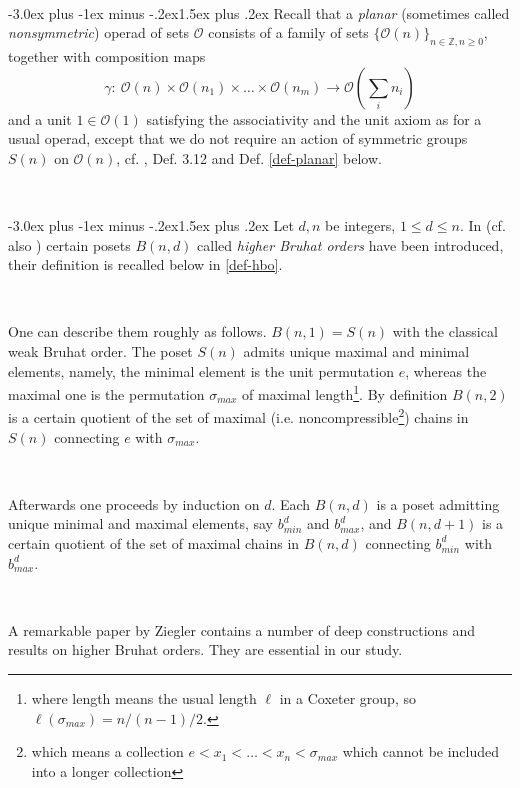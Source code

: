 \documentclass[12pt,a4paper]{article}
\makeatletter
\renewcommand{\subsection}{\@startsection{subsection}{2}{0pt}%
{-3.0ex plus -1ex minus -.2ex}{-1.5ex plus .2ex}%
{\normalfont\large\bf}}
\renewcommand{\subsection}{\@startsection{subsection}{2}{0pt}%
{-3.0ex plus -1ex minus -.2ex}{1.5ex plus .2ex}%
{\normalfont\large\bf}}
\renewcommand{\subsection}{\@startsection{subsection}{2}{0pt}%
{-3.0ex plus -1ex minus -.2ex}{-1.5ex plus .2ex}%
{\normalfont\normalsize\bf}}
\renewcommand{\subsection}{\@startsection{subsection}{2}{0pt}%
{-3.0ex plus -1ex minus -.2ex}{1.5ex plus .2ex}%
{\normalfont\normalsize\bf}}
\makeatother
\begin{document}
\

\subsection{} Recall that a {\em planar} (sometimes called {\em nonsymmetric}) operad of sets $\mathcal O$ consists of a family of sets 
$\{\mathcal O(n)\}_{n\in \mathbb{Z}, n\geq 0}$, together with composition maps
\[
\gamma:\ \mathcal{O}(n)\times \mathcal{O}(n_1)\times\ldots\times \mathcal{O}(n_m)\to 
\mathcal{O}(\sum_i n_i) 
\]
and a unit $1\in \mathcal{O}(1)$
satisfying the associativity and the unit axiom as for a usual operad, except that we do not require an action of symmetric groups $S(n)$ on $\mathcal{O}(n)$, cf. 
\cite{M}, Def. 3.12 and  Def. \ref{def-planar} below.

\

\subsection{}
Let $d, n$ be integers, $1\leq d\leq n$. In \cite{MSFA} (cf. also \cite{MS}) certain posets $B(n,d)$ 
called {\it higher Bruhat orders} have been introduced,  
their definition is recalled below in \ref{def-hbo}. 

\

One can describe them roughly as follows. $B(n,1) = S(n)$ with  
the classical weak Bruhat order. The poset $S(n)$ admits unique maximal and minimal elements, namely, the minimal element is the unit permutation $e$, whereas the maximal one 
is the permutation $\sigma_{max}$ of maximal length\footnote{where length means the usual length $\ell$ in a Coxeter group, so $\ell(\sigma_{max}) = n/(n-1)/2$.}. By definition 
$B(n,2)$ is a certain quotient of the set of maximal (i.e. noncompressible\footnote{which means a collection $e < x_1 < \ldots < x_n < \sigma_{max}$ which cannot be included into a longer collection}) chains in $S(n)$ connecting $e$ with $\sigma_{max}$. 

\

Afterwards one proceeds by induction on $d$. Each $B(n,d)$ is a poset admitting unique minimal and maximal elements, say $b_{min}^d$ and $b_{max}^d$, and $B(n,d+1)$ is a certain quotient of the set of maximal chains in $B(n,d)$ connecting $b_{min}^d$ with $b_{max}^d$.   

\

A remarkable paper by Ziegler \cite{Z} contains a number of deep constructions and results 
on higher Bruhat orders. They are essential in our study.
\end{document}
